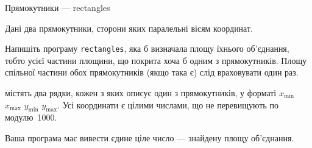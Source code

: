 \documentclass[14pt,a4paper]{extarticle}
\begin{document}
\begin{problemAllDefault}{Прямокутники --- rectangles}

Дані два прямокутники, сторони яких паралельні вісям координат.

\Task Напишіть програму \texttt{rectangles}, яка б визначала площу їхнього об’єднання, тобто усієї частини площини, що покрита хоча б одним з прямокутників. Площу спільної частини обох прямокутників (якщо така є) слід враховувати один раз.

\InputFile містять два рядки, кожен з яких описує один з прямокутників, у форматі $x_{\min}$ $x_{\max}$ $y_{\min}$ $y_{\max}$. Усі координати є цілими числами, що не перевищують по модулю~1000.

\OutputFile Ваша програма має вивести єдине ціле число --- знайдену площу об’єднання.

\Examples
\vspace*{-\baselineskip}
\begin{exampleSimpleThree}{6em}{4em}{6em}{}%
%
%
%
\end{exampleSimpleThree}



\end{problemAllDefault}
	
\end{document}
